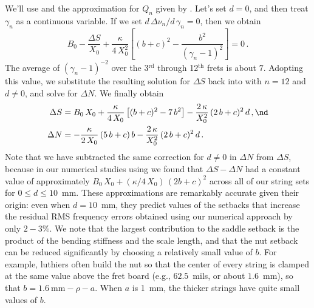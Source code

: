 We'll use  and the approximation for $Q_n$ given by . Let's set $d = 0$, and then treat $\gamma_n$ as a continuous variable. If we set $d\, \Delta \nu_n / d\, \gamma_n = 0$, then we obtain
\begin{equation}
  B_0 - \frac{\Delta S}{X_0} + \frac{\kappa}{4\, X_0^2} \left[ (b + c)^2 - \frac{b^2}{(\gamma_n - 1)^2} \right] = 0\, .
\end{equation}
The average of $(\gamma_n - 1)^{-2}$ over the 3$^\textrm{rd}$ through 12$^\textrm{th}$ frets is about $7$. Adopting this value, we substitute the resulting solution for $\Delta S$ back into  with $n = 12$ and $d \ne 0$, and solve for $\Delta N$. We finally obtain
\begin{subequations} \label{eqn:comp_approx}
  \begin{align}
    \label{eqn:comp_approx_ds} \Delta S &= B_0\, X_0 + \frac{\kappa}{4\, X_0} \left[(b + c)^2 - 7\, b^2\right] - \frac{2\, \kappa}{X_0^2}\, (2\, b + c)^2\, d\, , \nd \\
    \label{eqn:comp_approx_dn} \Delta N &= -\frac{\kappa}{2\, X_0}\, (5\, b + c)\, b - \frac{2\, \kappa}{X_0^2}\, (2\, b + c)^2\, d\, .
  \end{align}
\end{subequations}
Note that we have subtracted the same correction for $d \ne 0$ in $\Delta N$ from $\Delta S$, because in our numerical studies using  we found that $\Delta S - \Delta N$ had a constant value of approximately $B_0\, X_0 + (\kappa/4\, X_0)\, (2 b + c)^2$ across all of our string sets for $0 \le d \le 10$~mm. These approximations are remarkably accurate given their origin: even when $d = 10$~mm, they predict values of the setbacks that increase the residual RMS frequency errors obtained using our numerical approach by only $2 - 3$\%. We note that the largest contribution to the saddle setback is the product of the bending stiffness and the scale length, and that the nut setback can be reduced significantly by choosing a relatively small value of $b$. For example, luthiers often build the nut so that the center of every string is clamped at the same value above the fret board (e.g., $62.5$~mils, or about $1.6$~mm), so that $b = 1.6 \mathrm{~mm} - \rho - a$. When $a$ is 1~mm, the thicker strings have quite small values of $b$.


